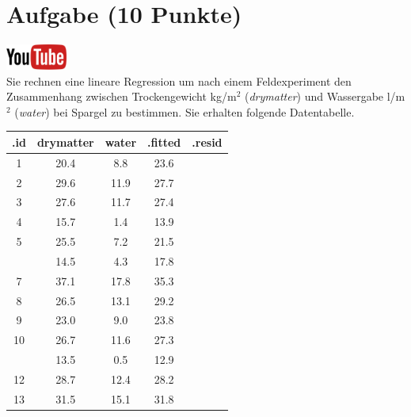 \documentclass[a4paper, 9pt]{scrartcl}\usepackage[]{graphicx}\usepackage[]{xcolor}
\newenvironment{knitrout}{}{} %
\begin{document}
 
\clearpage

\section{Aufgabe \hfill (10 Punkte)}

\hfill\href{https://youtu.be/dyQlYV9nOqY}{\includegraphics[width =
  2cm]{img/youtube}}\\[1Ex]

Sie rechnen eine lineare Regression um nach einem Feldexperiment den
Zusammenhang zwischen Trockengewicht kg/m$^2$ (\textit{drymatter}) und
Wassergabe l/m$^2$ (\textit{water}) bei Spargel zu bestimmen. Sie erhalten
folgende Datentabelle.

\begin{knitrout}
\color{fgcolor}\begin{table}[!h]
\centering\begingroup\fontsize{12}{14}\selectfont

\begin{tabular}{ccccc}
\toprule
.id & drymatter & water & .fitted & .resid\\
\midrule
1 & 20.4 & 8.8 & 23.6 & \\
2 & 29.6 & 11.9 & 27.7 & \\
3 & 27.6 & 11.7 & 27.4 & \\
4 & 15.7 & 1.4 & 13.9 & \\
5 & 25.5 & 7.2 & 21.5 & \\
\addlinespace
6 & 14.5 & 4.3 & 17.8 & \\
7 & 37.1 & 17.8 & 35.3 & \\
8 & 26.5 & 13.1 & 29.2 & \\
9 & 23.0 & 9.0 & 23.8 & \\
10 & 26.7 & 11.6 & 27.3 & \\
\addlinespace
11 & 13.5 & 0.5 & 12.9 & \\
12 & 28.7 & 12.4 & 28.2 & \\
13 & 31.5 & 15.1 & 31.8 & \\
\bottomrule
\end{tabular}
\endgroup{}
\end{table}

\end{knitrout}
\end{document}
